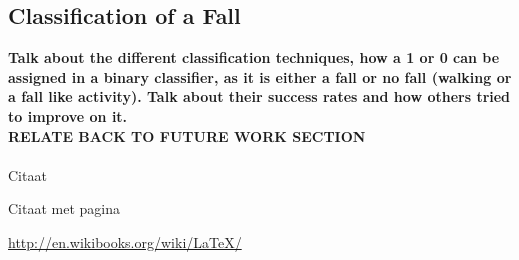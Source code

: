 \subsection{Classification of a Fall}
\textbf{Talk about the different classification techniques, how a 1 or 0 can be assigned in a binary classifier, as it is either a fall or no fall (walking or a fall like activity). Talk about their success rates and how others tried to improve on it. \\ RELATE BACK TO FUTURE WORK SECTION} \\\\















Citaat \cite{MScBuijs2010}

Citaat met pagina \cite[p.~10]{MScNugteren2010}

\url{http://en.wikibooks.org/wiki/LaTeX/}